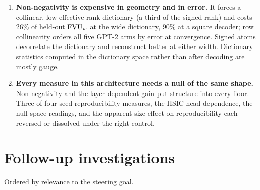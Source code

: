 \begin{enumerate}
or less.
Parameter-space decodes are instances, not descriptions, and must be
taken as deviations from the head mean to be legible at all, as the
geometry of categorical concepts predicts: a category's value vectors
share their parent's component and separate only as differences from
it~\cite{park2025}.
\item \textbf{Non-negativity is expensive in geometry and in error.} It
forces a collinear, low-effective-rank dictionary (a third of the signed
rank) and costs 26\% of held-out $\mathrm{FVU}_w$ at the wide dictionary, 90\% at a
square decoder; row collinearity orders all five GPT-2 arms by error at
convergence. Signed atoms decorrelate the dictionary and reconstruct
better at either width. Dictionary statistics computed in the dictionary
space rather than after decoding are mostly gauge.
\item \textbf{Every measure in this architecture needs a null of the same
shape.} Non-negativity and the layer-dependent gain put structure into
every floor. Three of four seed-reproducibility measures, the HSIC head
dependence, the null-space readings, and the apparent size effect on
reproducibility each reversed or dissolved under the right control.
\end{enumerate}

\section{Follow-up investigations}
\label{sec:followup}

Ordered by relevance to the steering goal.

